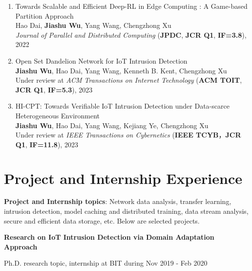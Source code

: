 \documentclass[letterpaper,10.9pt]{article}
\begin{document}
\begin{enumerate}
  \item Towards Scalable and Efficient Deep-RL in Edge Computing : A Game-based Partition Approach\\
  Hao Dai, \textbf{Jiashu Wu}, Yang Wang\textsuperscript{\Letter}, Chengzhong Xu\\
  \textit{Journal of Parallel and Distributed Computing} (\textbf{JPDC}, \textbf{JCR Q1}, \textbf{IF=3.8}), 2022

  \item Open Set Dandelion Network for IoT Intrusion Detection\\
  \textbf{Jiashu Wu}, Hao Dai, Yang Wang\textsuperscript{\Letter}, Kenneth B. Kent, Chengzhong Xu\\
  Under review at \textit{ACM Transactions on Internet Technology} (\textbf{ACM TOIT}, \textbf{JCR Q1}, \textbf{IF=5.3}), 2023

  \item HI-CPT: Towards Verifiable IoT Intrusion Detection under Data-scarce Heterogeneous Environment\\
  \textbf{Jiashu Wu}, Hao Dai, Yang Wang\textsuperscript{\Letter}, Kejiang Ye, Chengzhong Xu\\
  Under review at \textit{IEEE Transactions on Cybernetics} (\textbf{IEEE TCYB}，\textbf{JCR Q1}, \textbf{IF=11.8}), 2023
\end{enumerate}





\section{\textbf{Project and Internship Experience}}

\textbf{Project and Internship topics}: Network data analysis, transfer learning, intrusion detection, model caching and distributed training, data stream analysis, secure and efficient data storage, etc. Below are selected projects. 

\vspace{2mm}

\textbf{Research on IoT Intrusion Detection via Domain Adaptation Approach}

Ph.D. research topic, internship at BIT during Nov 2019 - Feb 2020
\end{document}
